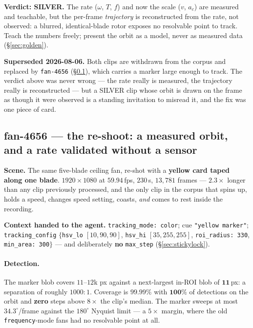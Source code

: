 \documentclass[11pt,a4paper]{article}
\begin{document}
\textbf{Verdict: SILVER.} The rate ($\omega$, $T$, $f$) and now the scale ($v$, $a_c$) are measured
and teachable, but the per-frame \emph{trajectory} is reconstructed from the rate, not observed: a
blurred, identical-blade rotor exposes no resolvable point to track. Teach the numbers freely;
present the orbit as a model, never as measured data (\S\ref{sec:golden}).

\textbf{Superseded 2026-08-06.} Both clips are withdrawn from the corpus and replaced by
\texttt{fan-4656} (\S\ref{sec:fan4656}), which carries a marker large enough to track. The
verdict above was never wrong --- the rate really is measured, the trajectory really is
reconstructed --- but a SILVER clip whose orbit is drawn on the frame as though it were observed
is a standing invitation to misread it, and the fix was one piece of card.

\subsection{fan-4656 --- the re-shoot: a measured orbit, and a rate validated without a sensor}
\label{sec:fan4656}

\textbf{Scene.} The same five-blade ceiling fan, re-shot with a \textbf{yellow card taped along
one blade}. $1920\times1080$ at $59.94$\,fps, $230$\,s, $13{,}781$ frames --- $2.3\times$ longer
than any clip previously processed, and the only clip in the corpus that spins up, holds a speed,
changes speed setting, coasts, \emph{and} comes to rest inside the recording.

\textbf{Context handed to the agent.} \texttt{tracking\_mode: color}; cue \texttt{"yellow
marker"}; \texttt{tracking\_config} $\{$\texttt{hsv\_lo} $[10,90,90]$, \texttt{hsv\_hi}
$[35,255,255]$, \texttt{roi\_radius: 330}, \texttt{min\_area: 300}$\}$ --- and deliberately
\textbf{no} \texttt{max\_step} (\S\ref{sec:stickylock}).

\paragraph{Detection.} The marker blob covers $11$--$12$k px against a next-largest in-ROI blob of
$\mathbf{11}$\,px: a separation of roughly $1000{:}1$. Coverage is $\mathbf{99.99\%}$ with
$\mathbf{100\%}$ of detections on the orbit and \textbf{zero} steps above $8\times$ the clip's
median. The marker sweeps at most $34.3^\circ$/frame against the $180^\circ$ Nyquist limit --- a
$5\times$ margin, where the old \texttt{frequency}-mode fans had no resolvable point at all.
\end{document}
